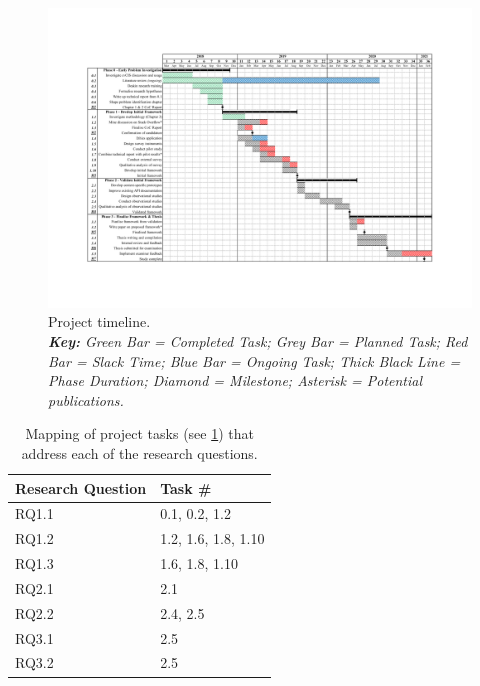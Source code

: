 \begin{landscape}


\begin{figure}[p!]
  \vspace{-0.5cm}
  \centering
  \includegraphics[width=\linewidth]{work-plan}
  \caption[PhD project timeline]{Project timeline. \\ \textit{\textbf{Key:} Green Bar = Completed Task; Grey Bar = Planned Task; Red Bar = Slack Time; Blue Bar = Ongoing Task; Thick Black Line = Phase Duration; Diamond = Milestone; Asterisk = Potential publications.}}
  \label{fig:project-status:work-plan}
\end{figure}
  
\end{landscape}

\begin{table}[p!]
\centering
\caption[Mapping of project tasks to research questions]{Mapping of project tasks (see \cref{fig:project-status:work-plan})  that address each of the research questions.}
\begin{tabular}{@{}l|l@{}}
\toprule
  \textbf{Research Question} &
  \textbf{Task \#} \\
  \midrule
    RQ1.1 & 0.1, 0.2, 1.2 \\
    RQ1.2 & 1.2, 1.6, 1.8, 1.10 \\
    RQ1.3 & 1.6, 1.8, 1.10 \\
    RQ2.1 & 2.1 \\
    RQ2.2 & 2.4, 2.5 \\
    RQ3.1 & 2.5 \\
    RQ3.2 & 2.5 \\
  \bottomrule
\end{tabular}
\end{table}


